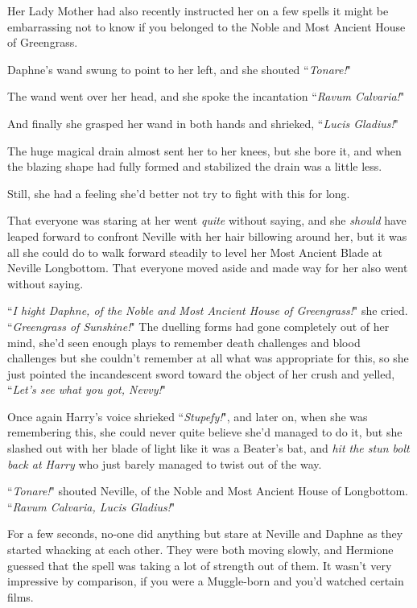 Her Lady Mother had also recently instructed her on a few spells it might be embarrassing not to know if you belonged to the Noble and Most Ancient House of Greengrass.

Daphne's wand swung to point to her left, and she shouted ``\emph{Tonare!}"

The wand went over her head, and she spoke the incantation ``\emph{Ravum Calvaria!}"

And finally she grasped her wand in both hands and shrieked, ``\emph{Lucis Gladius!}"

The huge magical drain almost sent her to her knees, but she bore it, and when the blazing shape had fully formed and stabilized the drain was a little less.

Still, she had a feeling she'd better not try to fight with this for long.

That everyone was staring at her went \emph{quite} without saying, and she \emph{should} have leaped forward to confront Neville with her hair billowing around her, but it was all she could do to walk forward steadily to level her Most Ancient Blade at Neville Longbottom. That everyone moved aside and made way for her also went without saying.

``\emph{I hight Daphne, of the Noble and Most Ancient House of Greengrass!}" she cried. ``\emph{Greengrass of Sunshine!}" The duelling forms had gone completely out of her mind, she'd seen enough plays to remember death challenges and blood challenges but she couldn't remember at all what was appropriate for this, so she just pointed the incandescent sword toward the object of her crush and yelled, ``\emph{Let's see what you got, Nevvy!}"

Once again Harry's voice shrieked ``\emph{Stupefy!}", and later on, when she was remembering this, she could never quite believe she'd managed to do it, but she slashed out with her blade of light like it was a Beater's bat, and \emph{hit the stun bolt back at Harry} who just barely managed to twist out of the way.

``\emph{Tonare!}" shouted Neville, of the Noble and Most Ancient House of Longbottom. ``\emph{Ravum Calvaria, Lucis Gladius!}"

\later

For a few seconds, no-one did anything but stare at Neville and Daphne as they started whacking at each other. They were both moving slowly, and Hermione guessed that the spell was taking a lot of strength out of them. It wasn't very impressive by comparison, if you were a Muggle-born and you'd watched certain films.

